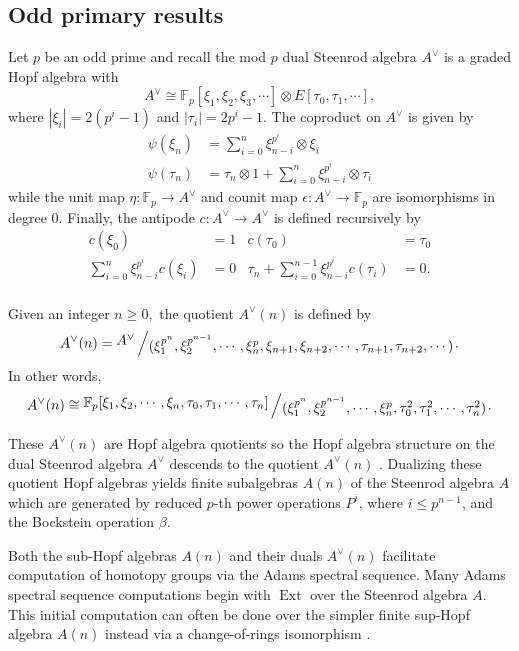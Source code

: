 \documentclass{amsart}
\theoremstyle{definition}
\theoremstyle{plain}
\numberwithin{theorem}{section}
\numberwithin{equation}{section}
\numberwithin{figure}{section}
\DeclareMathOperator{\Ext}{Ext}
\newcommand{\mF}{{\mathbb F}}
\newcommand{\0}{\langle 0 \rangle }
\newcommand{\bigslant}[2]{{\raisebox{.2em}{$#1$}\left/\raisebox{-.2em}{$#2$}\right.}}
\begin{document}
\subsection{Odd primary results} Let $p$ be an odd prime and recall the mod $p$ dual Steenrod algebra $A^\vee$ is a graded Hopf algebra with
\[
A^\vee \cong \mF_p [ \xi_1, \xi_2, \xi_3, \cdots ] \otimes E[ \tau_0, \tau_1, \cdots],
\]
where $| \xi_i | = 2(p^i - 1)$ and $| \tau_i | = 2p^i - 1$. The coproduct on $A^\vee$ is given by
\begin{align*}
    \psi(\xi_n) & = \sum_{i=0}^n \xi_{n-i}^{p^i} \otimes \xi_i  \\
    \psi (\tau_n) & = \tau_n \otimes 1 + \sum_{i=0}^n \xi_{n-i}^{p^i} \otimes \tau_i
\end{align*}
while the unit map $\eta: \mF_p \to A^\vee$ and counit map $\epsilon: A^\vee \to \mF_p$ are isomorphisms in degree $0$. Finally, the  antipode \color{black} $c: A^\vee \to A^\vee$ is defined recursively by 
\begin{align*}
    c(\xi_0) & = 1 &    c(\tau_0) &  = \tau_0 \\
    \sum_{i=0}^{n} \xi_{n-i}^{p^i} c(\xi_i) & = 0 & 
    \tau_n + \sum_{i=0}^{n-1} \xi_{n-i}^{p^i} c(\tau_i) & = 0. \\
\end{align*}

Given an integer $n \geq 0,$ the quotient $A^\vee(n)$ is defined by
\[
A^\vee(n) = \bigslant{A^\vee}{(\xi_1^{p^n}, \xi_2^{p^{n-1}}, \cdots, \xi_n^p, \xi_{n + 1}, \xi_{n + 2}, \cdots, \tau_{n + 1}, \tau_{n + 2}, \cdots)}.
\]
In other words,
\[
A^\vee(n) \cong \bigslant{\mF_p [\xi_1, \xi_2, \cdots, \xi_n, \tau_0, \tau_1, \cdots, \tau_n]}{(\xi_1^{p^n}, \xi_2^{p^{n-1}}, \cdots, \xi_n^p,\tau_0^2, \tau_1^2, \cdots, \tau_n^2)}.
\]

These $A^\vee(n)$ are Hopf algebra quotients so the Hopf algebra structure on the dual Steenrod algebra  $A^\vee$ descends to the quotient $A^\vee(n)$ \cite{Rosen72, AdamsMargolis74}. Dualizing these quotient Hopf algebras yields finite subalgebras $A(n)$ of the Steenrod algebra $ A$ which are generated by reduced $p$-th power operations $P^i$, where $i \leq p^{n-1}$, and the Bockstein operation $\beta$. 

Both the sub-Hopf algebras $A(n)$ and their duals $A^\vee (n)$ facilitate computation of homotopy groups via the Adams spectral sequence. Many Adams spectral sequence computations begin with $\Ext$ over the Steenrod algebra $A$. This initial computation can often be done over the simpler finite sup-Hopf algebra $A(n)$ instead via a change-of-rings isomorphism \cite[A1.3.12]{Ravenel86}. 
\end{document}
